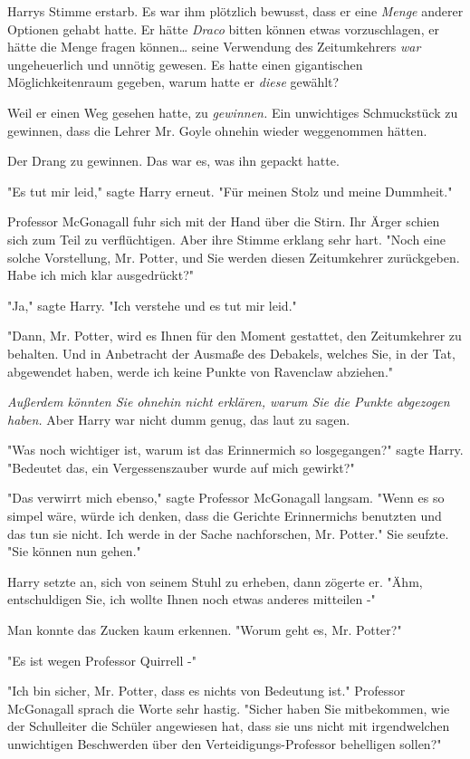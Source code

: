 {Harrys Stimme erstarb. Es war ihm plötzlich bewusst, dass er eine \emph{Menge} anderer Optionen gehabt hatte. Er hätte \emph{Draco} bitten können etwas vorzuschlagen, er hätte die Menge fragen können… seine Verwendung des Zeitumkehrers \emph{war} ungeheuerlich und unnötig gewesen. Es hatte einen gigantischen Möglichkeitenraum gegeben, warum hatte er \emph{diese} gewählt?

Weil er einen Weg gesehen hatte, zu \emph{gewinnen.} Ein unwichtiges Schmuckstück zu gewinnen, dass die Lehrer Mr. Goyle ohnehin wieder weggenommen hätten.

Der Drang zu gewinnen. Das war es, was ihn gepackt hatte.

"Es tut mir leid," sagte Harry erneut. "Für meinen Stolz und meine Dummheit."

Professor McGonagall fuhr sich mit der Hand über die Stirn. Ihr Ärger schien sich zum Teil zu verflüchtigen. Aber ihre Stimme erklang sehr hart. "Noch eine solche Vorstellung, Mr. Potter, und Sie werden diesen Zeitumkehrer zurückgeben. Habe ich mich klar ausgedrückt?"

"Ja," sagte Harry. "Ich verstehe und es tut mir leid."

"Dann, Mr. Potter, wird es Ihnen für den Moment gestattet, den Zeitumkehrer zu behalten. Und in Anbetracht der Ausmaße des Debakels, welches Sie, in der Tat, abgewendet haben, werde ich keine Punkte von Ravenclaw abziehen."

\emph{Außerdem könnten Sie ohnehin nicht erklären, warum Sie die Punkte} \emph{abgezogen haben.} Aber Harry war nicht dumm genug, das laut zu sagen.

"Was noch wichtiger ist, warum ist das Erinnermich so losgegangen?" sagte Harry. "Bedeutet das, ein Vergessenszauber wurde auf mich gewirkt?"

"Das verwirrt mich ebenso," sagte Professor McGonagall langsam. "Wenn es so simpel wäre, würde ich denken, dass die Gerichte Erinnermichs benutzten und das tun sie nicht. Ich werde in der Sache nachforschen, Mr. Potter." Sie seufzte. "Sie können nun gehen."

Harry setzte an, sich von seinem Stuhl zu erheben, dann zögerte er. "Ähm, entschuldigen Sie, ich wollte Ihnen noch etwas anderes mitteilen -"

Man konnte das Zucken kaum erkennen. "Worum geht es, Mr. Potter?"

"Es ist wegen Professor Quirrell -"

"Ich bin sicher, Mr. Potter, dass es nichts von Bedeutung ist." Professor McGonagall sprach die Worte sehr hastig. "Sicher haben Sie mitbekommen, wie der Schulleiter die Schüler angewiesen hat, dass sie uns nicht mit irgendwelchen unwichtigen Beschwerden über den Verteidigungs-Professor behelligen sollen?"

}
